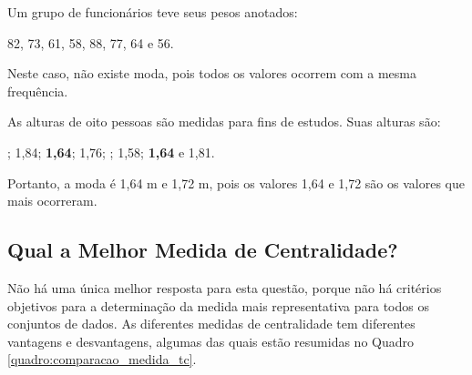 \documentclass[11pt,fleqn]{book}
\numberwithin{mpicture}{chapter}
\numberwithin{mtable}{chapter}
\numberwithin{mframe}{chapter}
\begin{document}
\begin{example}
	Um grupo de funcionários teve seus pesos anotados:
	\begin{center}
		82, 73, 61, 58, 88, 77, 64 e 56.
	\end{center}
	
	Neste caso, não existe moda, pois todos os valores ocorrem com a mesma frequência.
\end{example}

\begin{example}
	As alturas de oito pessoas são medidas para fins de estudos. Suas alturas são:
	\begin{center}
		; 1,84; \textbf{1,64}; 1,76; ; 1,58; \textbf{1,64} e 1,81.
	\end{center}
	
	Portanto, a moda é 1,64 m e 1,72 m, pois os valores 1,64 e 1,72 são os valores que mais ocorreram.
\end{example}

\subsection{Qual a Melhor Medida de Centralidade?}

Não há uma única melhor resposta para esta questão, porque não há critérios objetivos para a determinação da medida mais representativa para todos os conjuntos de dados. As diferentes medidas de centralidade tem diferentes vantagens e desvantagens, algumas das quais estão resumidas no Quadro \ref{quadro:comparacao_medida_tc}.\\
\end{document}
